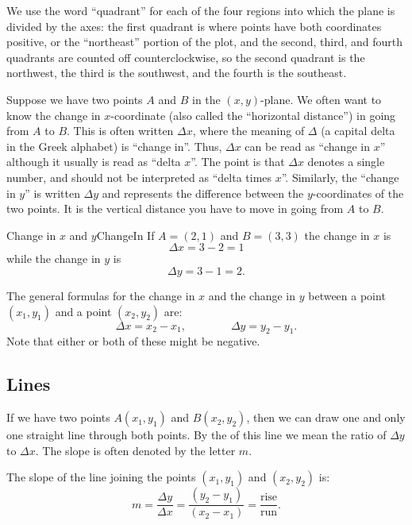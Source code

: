 We use the word ``quadrant'' for each of the four regions into which
the plane is divided by the axes: the first quadrant is where points
have both coordinates positive, or the ``northeast'' portion of the
plot, and the second, third, and fourth quadrants are counted off
counterclockwise, so the second quadrant is the northwest, the third
is the southwest, and the fourth is the southeast.

Suppose we have two points $A$ and $B$ in the $(x,y)$-plane.
We often want to know the change in $x$-coordinate (also called the
``horizontal distance'') in going from $A$ to $B$.  This is often
written $\Delta x$, where the meaning of $\Delta$ (a capital delta in
the Greek alphabet) is ``change in''. Thus, $\Delta x$ can be read as
``change in $x$'' although it usually is read as ``delta $x$''. The
point is that $\Delta x$ denotes a single number, and should not be
interpreted as ``delta times $x$''. Similarly, the ``change in $y$'' is written $\Delta y$
and represents the difference between the $y$-coordinates of the 
two points. It is the vertical distance you have to move in going from $A$ to $B$. \\

\begin{example}{Change in $x$ and $y$}{ChangeIn}\label{ChangeIn}
If $A=(2,1)$ and $B=(3,3)$ the change in $x$ is
$$\Delta x=3-2=1$$
while the change in $y$ is
$$\Delta y= 3-1=2.$$
\vspace{-0.5cm}
\end{example}

The general formulas for the change in $x$ and the change in $y$ 
between a point $(x_1,y_1)$ and a point $(x_2,y_2)$ are:
$$
\Delta x=x_2-x_1,\qquad\qquad\Delta y=y_2-y_1.
$$
Note that either or both of these might be negative.



\subsection{Lines}
If we have two  points $A(x_1,y_1)$ and $B(x_2,y_2)$, then we can draw one
and only one straight line through both points.  By the  of this line
we mean the ratio of $\Delta y$ to $\Delta x$.  The slope is often denoted by the letter $m$. \\

\begin{formulabox}
The slope of the line joining the points $(x_1,y_1)$ and $(x_2,y_2)$ is:
$$m=\frac{\Delta y}{\Delta x}=\frac{(y_2-y_1)}{(x_2-x_1)}=\frac{\mbox{rise}}{\mbox{run}}.$$
\end{formulabox}

